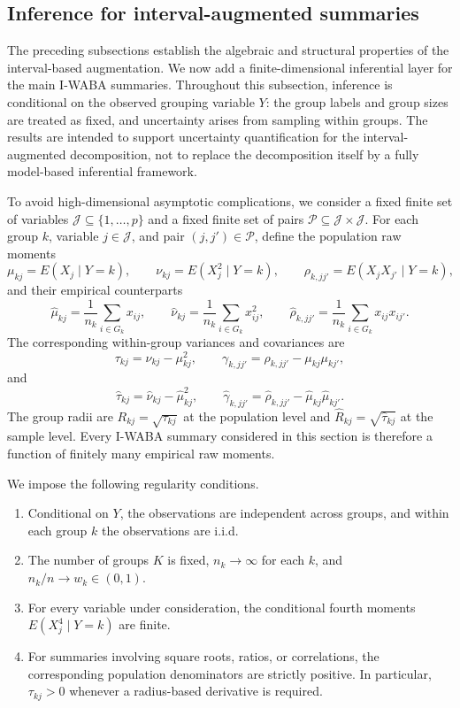 \documentclass[preprint, times, 12pt, authoryear]{elsarticle}
\begin{document}
 
\subsection{Inference for interval-augmented summaries}\label{sec:inference}

The preceding subsections establish the algebraic and structural properties of the interval-based augmentation. We now add a finite-dimensional inferential layer for the main I-WABA summaries. Throughout this subsection, inference is conditional on the observed grouping variable $Y$: the group labels and group sizes are treated as fixed, and uncertainty arises from sampling within groups. The results are intended to support uncertainty quantification for the interval-augmented decomposition, not to replace the decomposition itself by a fully model-based inferential framework.

To avoid high-dimensional asymptotic complications, we consider a fixed finite set of variables $\mathcal J\subseteq\{1,\ldots,p\}$ and a fixed finite set of pairs $\mathcal P\subseteq \mathcal J\times\mathcal J$. For each group $k$, variable $j\in\mathcal J$, and pair $(j,j')\in\mathcal P$, define the population raw moments
\[
\mu_{kj}=E(X_j\mid Y=k),\qquad
\nu_{kj}=E(X_j^2\mid Y=k),\qquad
\rho_{k,jj'}=E(X_jX_{j'}\mid Y=k),
\]
and their empirical counterparts
\[
\hat\mu_{kj}=\frac{1}{n_k}\sum_{i\in G_k}x_{ij},\qquad
\hat\nu_{kj}=\frac{1}{n_k}\sum_{i\in G_k}x_{ij}^2,\qquad
\hat\rho_{k,jj'}=\frac{1}{n_k}\sum_{i\in G_k}x_{ij}x_{ij'}.
\]
The corresponding within-group variances and covariances are
\[
\tau_{kj}=\nu_{kj}-\mu_{kj}^2,\qquad
\gamma_{k,jj'}=\rho_{k,jj'}-\mu_{kj}\mu_{kj'},
\]
and
\[
\hat\tau_{kj}=\hat\nu_{kj}-\hat\mu_{kj}^2,\qquad
\hat\gamma_{k,jj'}=\hat\rho_{k,jj'}-\hat\mu_{kj}\hat\mu_{kj'}.
\]
The group radii are $R_{kj}=\sqrt{\tau_{kj}}$ at the population level and $\hat R_{kj}=\sqrt{\hat\tau_{kj}}$ at the sample level. Every I-WABA summary considered in this section is therefore a function of finitely many empirical raw moments.

We impose the following regularity conditions.

\begin{enumerate}[label=(A\arabic*)]
	\item \label{ass:groups} Conditional on $Y$, the observations are independent across groups, and within each group $k$ the observations are i.i.d.
	\item \label{ass:weights} The number of groups $K$ is fixed, $n_k\to\infty$ for each $k$, and $n_k/n\to w_k\in(0,1)$.
	\item \label{ass:fourth} For every variable under consideration, the conditional fourth moments $E(X_j^4\mid Y=k)$ are finite.
	\item \label{ass:interior} For summaries involving square roots, ratios, or correlations, the corresponding population denominators are strictly positive. In particular, $\tau_{kj}>0$ whenever a radius-based derivative is required.
\end{enumerate}
\end{document}

